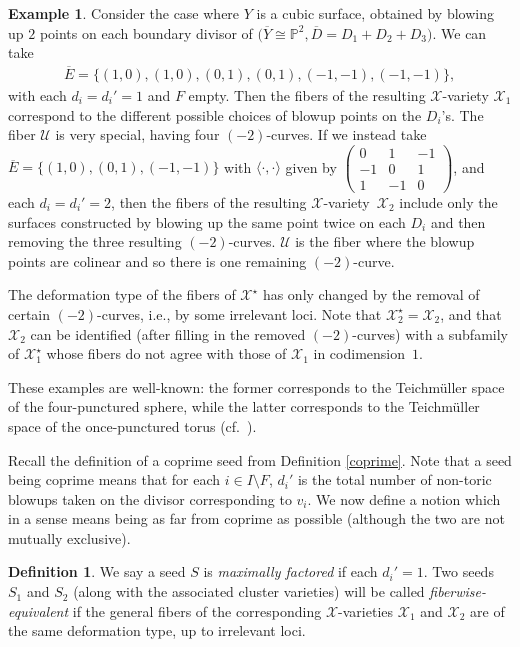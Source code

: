 \documentclass[11pt]{article}
\numberwithin{equation}{section}
\numberwithin{figure}{section}
\numberwithin{table}{section}
\let\?=\overline
\let\bb=\mathbb
\let\s=\mathcal
\theoremstyle{definition}
\newtheorem{dfn}[thm]{Definition}
\newtheorem{eg}[thm]{Example}
\begin{document}
\begin{eg}\label{cubic cluster}
Consider the case where $Y$ is a cubic surface, obtained by blowing up $2$ points on each boundary divisor of $\big(\?{Y}\cong \bb{P}^2,\?{D}=D_1+D_2+D_3\big)$. We can take
\begin{gather*}
	\?{E}=\{(1,0),(1,0),(0,1),(0,1),(-1,-1),(-1,-1)\},
\end{gather*}
with each $d_i=d_i'=1$ and $F$ empty. Then the fibers of the resulting $\s{X}$-variety $\s{X}_1$ correspond to the different possible choices of blowup points on the $D_i$'s. The fiber $\s{U}$ is very special, having four $(-2)$-curves. If we instead take $\?{E}=\{(1,0),(0,1),(-1,-1)\}$ with $\langle \cdot,\cdot\rangle$ given by
	$\left(\begin{smallmatrix}
		0 &1 &-1 \\
	 -1 &0 &1 \\
	 1 &-1 &0
		\end{smallmatrix}\right)$,
		and each $d_i=d_i'=2$, then the fibers of the resulting $\s{X}$-variety~$\s{X}_2$ include only the surfaces constructed by blowing up the same point twice on each $D_i$ and then removing the three resulting $(-2)$-curves. $\s{U}$ is the fiber where the blowup points are colinear and so there is one remaining $(-2)$-curve.
		
The deformation type of the fibers of $\s{X}^{\star}$ has only changed by the removal of certain $(-2)$-curves, i.e., by some irrelevant loci. Note that $\s{X}^{\star}_2=\s{X}_2$, and that $\s{X}_2$ can be identified (after filling in the removed $(-2)$-curves) with a subfamily of $\s{X}^{\star}_1$ whose fibers do not agree with those of $\s{X}_1$ in codimension~$1$.

These examples are well-known: the former corresponds to the Teichm\"{u}ller space of the four-punctured sphere, while the latter corresponds to the Teichm\"{u}ller space of the once-punctured torus (cf.\ \cite[Section~2.7]{FG1}).
\end{eg}

Recall the definition of a coprime seed from Definition \ref{coprime}. Note that a seed being coprime means that for each $i\in I\setminus F$, $d_i'$ is the total number of non-toric blowups taken on the divisor corresponding to $v_i$. We now define a notion which in a sense means being as far from coprime as possible (although the two are not mutually exclusive).

\begin{dfn}\label{EquivalentClusters} We say a seed $S$ is {\it maximally factored} if each $d_i'=1$. Two seeds $S_1$ and $S_2$ (along with the associated cluster varieties) will be called {\it fiberwise-equivalent} if the general fibers of the corresponding $\s{X}$-varieties $\s{X}_1$ and $\s{X}_2$ are of the same deformation type, up to irrelevant loci.
\end{dfn}
\end{document}
